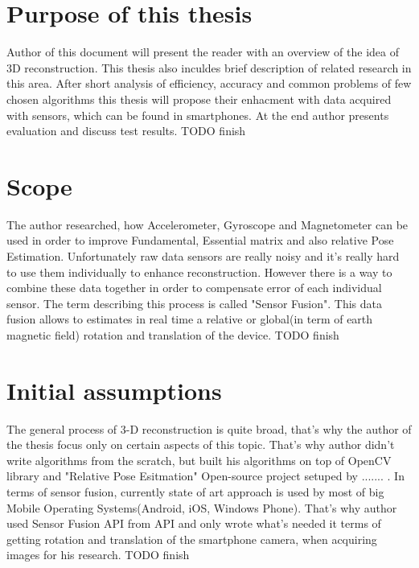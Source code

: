 \section{Purpose of this thesis} %
Author of this document will present the reader with an overview of the idea of 3D reconstruction. This thesis also inculdes brief description of related research in this area. After short analysis of efficiency, accuracy and common problems of few chosen algorithms this thesis will propose their enhacment with data acquired with sensors, which can be found in smartphones. At the end author presents evaluation and discuss test results. TODO finish

\section{Scope}
The author researched, how Accelerometer, Gyroscope and Magnetometer can be used in order to improve Fundamental, Essential matrix and also relative Pose Estimation. Unfortunately raw data sensors are really noisy and it's really hard to use them individually to enhance reconstruction. However there is a way to combine these data together in order to compensate error of each individual sensor. The term describing this process is called "Sensor Fusion". This data fusion allows to estimates in real time a relative or global(in term of earth magnetic field) rotation and translation of the device. TODO finish
\section{Initial assumptions}
The general process of 3-D reconstruction is quite broad, that's why the author of the thesis focus only on certain aspects of this topic. That's why author didn't write algorithms from the scratch, but built his algorithms on top of OpenCV library and "Relative Pose Esitmation" Open-source project setuped by ....... . In terms of sensor fusion, currently state of art approach is used by most of big Mobile Operating Systems(Android, iOS, Windows Phone). That's why author used Sensor Fusion API from API and only wrote what's needed it terms of getting rotation and translation of the smartphone camera, when acquiring images for his research. TODO finish
